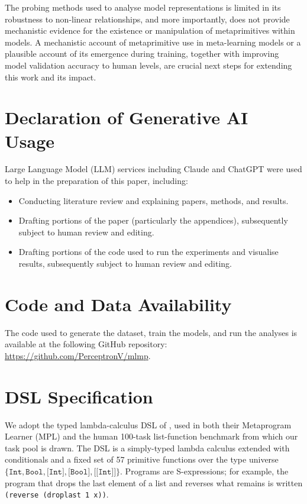 \documentclass[12pt]{article}
\begin{document}
The probing methods used to analyse model representations is limited in its robustness to non-linear relationships, and more importantly, does not provide mechanistic evidence for the existence or manipulation of metaprimitives within models. A mechanistic account of metaprimitive use in meta-learning models or a plausible account of its emergence during training, together with improving model validation accuracy to human levels, are crucial next steps for extending this work and its impact.




\newpage

\appendix

\section{Declaration of Generative AI Usage}
\label{app:llm}

Large Language Model (LLM) services including Claude and ChatGPT were used to help in the preparation of this paper, including:\begin{itemize}
    \item Conducting literature review and explaining papers, methods, and results.
    \item Drafting portions of the paper (particularly the appendices), subsequently subject to human review and editing.
    \item Drafting portions of the code used to run the experiments and visualise results, subsequently subject to human review and editing.
\end{itemize}

\section{Code and Data Availability}
\label{app:code-data}

The code used to generate the dataset, train the models, and run the analyses is available at the following GitHub repository: \href{https://github.com/PerceptronV/mlmp}{https://github.com/PerceptronV/mlmp}.

\section{DSL Specification}
\label{app:dsl-specification}

We adopt the typed lambda-calculus DSL of \citet{rule2024symbolic}, used in both their Metaprogram Learner (MPL) and the human 100-task list-function benchmark from which our task pool is drawn. The DSL is a simply-typed lambda calculus extended with conditionals and a fixed set of 57 primitive functions over the type universe $\{\texttt{Int}, \texttt{Bool}, \texttt{[Int]}, \texttt{[Bool]}, \texttt{[[Int]]}\}$. Programs are S-expressions; for example, the program that drops the last element of a list and reverses what remains is written \texttt{(reverse (droplast 1 x))}.
\end{document}
